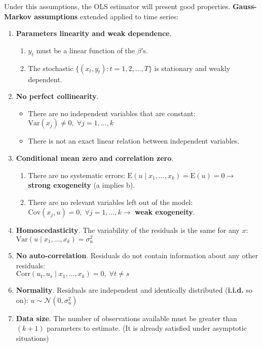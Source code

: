 \documentclass[10pt, a4paper, landscape]{article}
\newcommand{\E}{\mathrm{E}}
\newcommand{\Var}{\mathrm{Var}}
\newcommand{\Cov}{\mathrm{Cov}}
\newcommand{\Corr}{\mathrm{Corr}}
\begin{document}
\begin{multicols}{3}
		Under this assumptions, the OLS estimator will present good properties. \textbf{Gauss-Markov assumptions} extended applied to time series:
		
		\begin{enumerate}[leftmargin=*, label=t\arabic{*}.]
			\item \textbf{Parameters linearity and weak dependence}.
			
			\begin{enumerate}[leftmargin=*, label=\alph{*}.]
				\item $y_{t}$ must be a linear function of the $\beta$'s.
				\item The stochastic $\lbrace( x_{t}, y_{t}) : t = 1, 2, \ldots, T \rbrace$ is stationary and weakly dependent.
			\end{enumerate}
			
			\item \textbf{No perfect collinearity}.
			
			\begin{itemize}[leftmargin=*]
				\item There are no independent variables that are constant: $\Var(x_{j}) \neq 0, \; \forall j = 1, \ldots, k$
				\item There is not an exact linear relation between independent variables.
			\end{itemize}
			
			\item \textbf{Conditional mean zero and correlation zero}.
			
			\begin{enumerate}[leftmargin=*, label=\alph{*}.]
				\item There are no systematic errors: $\E(u \mid x_{1}, \ldots, x_{k}) = \E(u) = 0 \rightarrow$ \textbf{strong exogeneity} (a implies b).
				\item There are no relevant variables left out of the model: $\Cov(x_{j} , u) = 0, \; \forall j = 1, \ldots, k \rightarrow$ \textbf{weak exogeneity}.
			\end{enumerate}
			
			\item \textbf{Homoscedasticity}. The variability of the residuals is the same for any $x$: $\Var(u \mid x_{1}, \ldots, x_{k}) = \sigma^{2}_{u}$
			\item \textbf{No auto-correlation}. Residuals do not contain information about any other residuals: \\
			$\Corr(u_{t}, u_{s} \mid x_{1}, \ldots, x_{k}) = 0, \; \forall t \neq s$
			\item \textbf{Normality}. Residuals are independent and identically distributed (\textbf{i.i.d.} so on): $u \sim \mathcal{N}(0, \sigma^{2}_{u})$
			\item \textbf{Data size}. The number of observations available must be greater than $(k + 1)$ parameters to estimate. (It is already satisfied under asymptotic situations)
		\end{enumerate}
		

\end{multicols}
\end{document}
